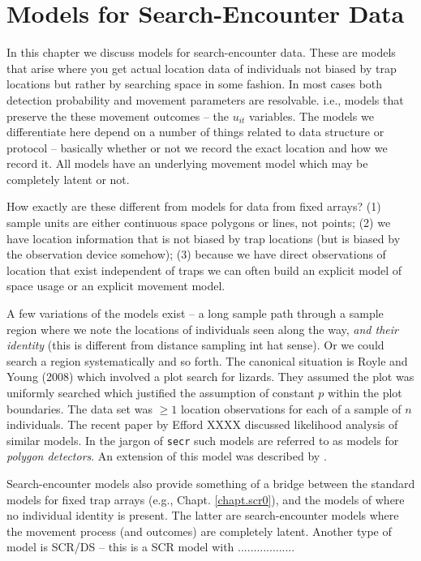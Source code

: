 \chapter{Models for  Search-Encounter Data}
\label{chapt.search-encounter}

\vspace{0.3cm}


In this chapter we discuss models for 
search-encounter data. These are models that arise where you get
actual location data of individuals not biased by trap locations but
rather by searching space in some fashion. In most cases both
detection probability and movement parameters are resolvable. i.e.,
models that preserve the these movement outcomes -- the $u_{it}$ variables.
The models we differentiate here depend on a number of
things related to data structure or protocol -- basically whether or
not we record the exact location and how we record it. All models have
an underlying movement model which may be completely latent or not.

How exactly
are these different from models for data from fixed arrays?  (1)
sample units are either continuous space polygons or lines, not
points; (2) we have location information that is not biased by trap
locations (but is biased by the observation device somehow); (3)
because we have direct observations of location that exist independent
of traps we can often build an explicit model of space usage or an
explicit movement model.

A few variations of the models exist -- a long sample path through a
sample region where we note the locations of individuals seen along
the way, {\it and their identity} (this is different from distance
sampling int hat sense). Or we could search a region systematically
and so forth.  
The canonical situation is Royle and Young (2008) which involved a
plot search for lizards. They assumed the plot was uniformly searched
which justified the assumption of constant $p$ within the plot
boundaries. The data set was $\ge 1$ location observations for each of
a sample of $n$ individuals. 
The recent paper by Efford XXXX
discussed likelihood analysis of similar models. In the jargon of
\mbox{\tt secr} such models are referred to as models for {\it polygon detectors}.
 An extension of this model was described
by \citep{royle_etal:2011mee}.  

Search-encounter models also provide something of a bridge between the
standard models for fixed trap arrays (e.g., Chapt. \ref{chapt.scr0}),
and the models of \citep{chandler_royle:2012} where no individual
identity is present. The latter are search-encounter models where the
movement process (and outcomes) are completely latent. Another type of
model is SCR/DS -- this is a SCR model with ..................

